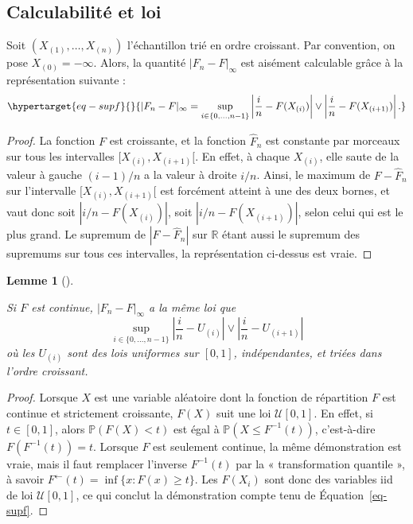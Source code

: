 \documentclass[
  10,
  letterpaper,
  DIV=11,
  numbers=noendperiod]{scrreport}
\theoremstyle{plain}
\theoremstyle{definition}
\theoremstyle{plain}
\theoremstyle{definition}
\theoremstyle{definition}
\theoremstyle{plain}
\newtheorem{lemma}{Lemme}[chapter]
\theoremstyle{remark}
\begin{document}
\hypertarget{calculabilituxe9-et-loi}{%
\subsection*{Calculabilité et loi}\label{calculabilituxe9-et-loi}}

Soit \((X_{(1)}, \dotsc, X_{(n)})\) l'échantillon trié en ordre
croissant. Par convention, on pose \(X_{(0)} = -\infty\). Alors, la
quantité \(|F_n - F|_\infty\) est aisément calculable grâce à la
représentation suivante :
\begin{equation}\protect\hypertarget{eq-supf}{}{|F_n - F|_\infty = \sup_{i\in \{0, \dotsc, n-1\}}\left|\frac{i}{n} - F(X_{(i)})\right| \vee \left| \frac{i}{n} - F(X_{(i+1)})\right|. }\label{eq-supf}\end{equation}

\begin{proof}

La fonction \(F\) est croissante, et la fonction \(\hat{F}_n\) est
constante par morceaux sur tous les intervalles
\([X_{(i)}, X_{(i+1)}[\). En effet, à chaque \(X_{(i)}\), elle saute de
la valeur à gauche \((i-1)/n\) a la valeur à droite \(i/n\). Ainsi, le
maximum de \(F - \hat{F}_n\) sur l'intervalle \([X_{(i)}, X_{(i+1)}[\)
est forcément atteint à une des deux bornes, et vaut donc soit
\(|i/n - F(X_{(i)})|\), soit \(|i/n - F(X_{(i+1)})|\), selon celui qui
est le plus grand. Le supremum de \(|F - \hat{F}_n|\) sur \(\mathbb{R}\)
étant aussi le supremum des supremums sur tous ces intervalles, la
représentation ci-dessus est vraie.

\end{proof}

\begin{lemma}[]\protect\hypertarget{lem-gc}{}\label{lem-gc}

Si \(F\) est continue, \(|F_n - F|_\infty\) a la même loi que
\[ \sup_{i\in \{0, \dotsc, n-1\}}\left|\frac{i}{n} - U_{(i)}\right| \vee \left| \frac{i}{n} - U_{(i+1)}\right|\]
où les \(U_{(i)}\) sont des lois uniformes sur \([0,1]\), indépendantes,
et triées dans l'ordre croissant.

\end{lemma}

\begin{proof}

Lorsque \(X\) est une variable aléatoire dont la fonction de répartition
\(F\) est continue et strictement croissante, \(F(X)\) suit une loi
\(\mathscr{U}[0,1]\). En effet, si \(t\in [0,1]\), alors
\(\mathbb{P}(F(X)<t)\) est égal à \(\mathbb{P}(X \leqslant F^{-1}(t))\),
c'est-à-dire \(F(F^{-1}(t)) = t\). Lorsque \(F\) est seulement continue,
la même démonstration est vraie, mais il faut remplacer l'inverse
\(F^{-1}(t)\) par la « transformation quantile », à savoir
\(F^{\leftarrow}(t) = \inf\{x : F(x)\geqslant t\}\). Les \(F(X_i)\) sont
donc des variables iid de loi \(\mathscr{U}[0,1]\), ce qui conclut la
démonstration compte tenu de Équation~\ref{eq-supf}.

\end{proof}
\end{document}
